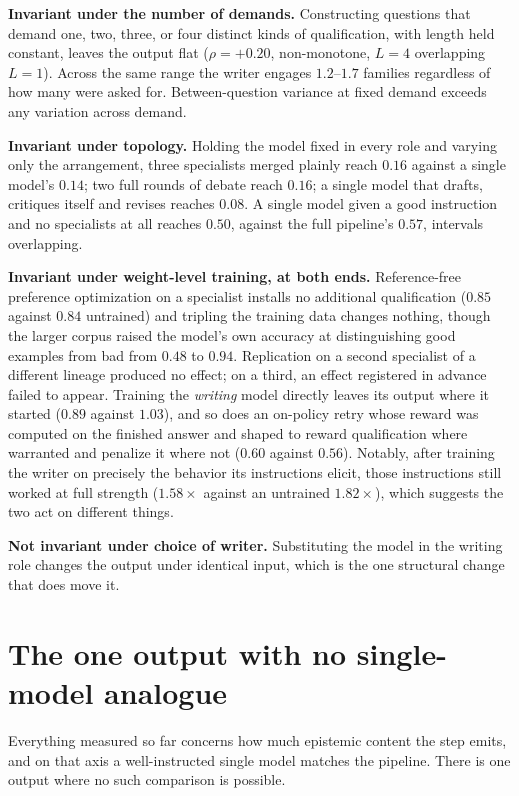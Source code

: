 \documentclass[11pt]{article}
\begin{document}
\textbf{Invariant under the number of demands.} Constructing questions that
demand one, two, three, or four distinct kinds of qualification, with length
held constant, leaves the output flat ($\rho = +0.20$, non-monotone, $L{=}4$
overlapping $L{=}1$). Across the same range the writer engages $1.2$--$1.7$
families regardless of how many were asked for. Between-question variance at
fixed demand exceeds any variation across demand.

\textbf{Invariant under topology.} Holding the model fixed in every role and
varying only the arrangement, three specialists merged plainly reach $0.16$
against a single model's $0.14$; two full rounds of debate reach $0.16$; a
single model that drafts, critiques itself and revises reaches $0.08$. A
single model given a good instruction and no specialists at all reaches $0.50$,
against the full pipeline's $0.57$, intervals overlapping.

\textbf{Invariant under weight-level training, at both ends.} Reference-free
preference optimization on a specialist installs no additional qualification
($0.85$ against $0.84$ untrained) and tripling the training data changes
nothing, though the larger corpus raised the model's own accuracy at
distinguishing good examples from bad from $0.48$ to $0.94$. Replication on a
second specialist of a different lineage produced no effect; on a third, an
effect registered in advance failed to appear. Training the \emph{writing}
model directly leaves its output where it started ($0.89$ against $1.03$), and
so does an on-policy retry whose reward was computed on the finished answer and
shaped to reward qualification where warranted and penalize it where not
($0.60$ against $0.56$). Notably, after training the writer on precisely the
behavior its instructions elicit, those instructions still worked at full
strength ($1.58\times$ against an untrained $1.82\times$), which suggests the
two act on different things.

\textbf{Not invariant under choice of writer.} Substituting the model in the
writing role changes the output under identical input, which is the one
structural change that does move it.


\section{The one output with no single-model analogue}
\label{sec:tension}
Everything measured so far concerns how much epistemic content the step emits,
and on that axis a well-instructed single model matches the pipeline. There is
one output where no such comparison is possible.
\end{document}

